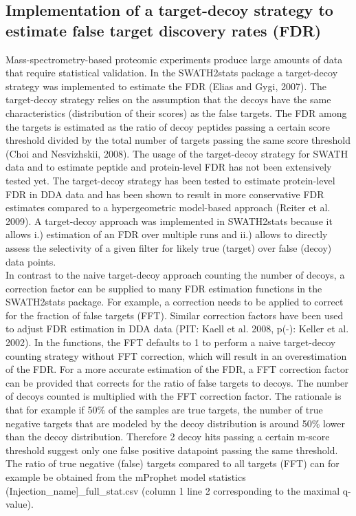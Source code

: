 \documentclass[a4paper]{article}
\begin{document}
\subsection{Implementation of a target-decoy strategy to estimate false target discovery rates (FDR)}
Mass-spectrometry-based proteomic experiments produce large amounts of data that require statistical validation. In the SWATH2stats package a target-decoy strategy was implemented to estimate the FDR (Elias and Gygi, 2007). The target-decoy strategy relies on the assumption that the decoys have the same characteristics (distribution of their scores) as the false targets. The FDR among the targets is estimated as the ratio of decoy peptides passing a certain score threshold divided by the total number of targets passing the same score threshold (Choi and Nesvizhskii, 2008). The usage of the target-decoy strategy for SWATH data and to estimate peptide and protein-level FDR has not been extensively tested yet. The target-decoy strategy has been tested to estimate protein-level FDR in DDA data and has been shown to result in more conservative FDR estimates compared to a hypergeometric model-based approach (Reiter et al. 2009). A target-decoy approach was implemented in SWATH2stats because it allows i.) estimation of an FDR over multiple runs and ii.) allows to directly assess the selectivity of a given filter for likely true (target) over false (decoy) data points.\\
In contrast to the naive target-decoy approach counting the number of decoys, a correction factor can be supplied to many FDR estimation functions in the SWATH2stats package. For example, a correction needs to be applied to correct for the fraction of false targets (FFT). Similar correction factors have been used to adjust FDR estimation in DDA data (PIT: Kaell et al. 2008, p(-): Keller et al. 2002). In the functions, the FFT defaults to 1 to perform a naive target-decoy counting strategy without FFT correction, which will result in an overestimation of the FDR. For a more accurate estimation of the FDR, a FFT correction factor can be provided that corrects for the ratio of false targets to decoys. The number of decoys counted is multiplied with the FFT correction factor. The rationale is that for example if 50\% of the samples are true targets, the number of true negative targets that are modeled by the decoy distribution is around 50\% lower than the decoy distribution. Therefore 2 decoy hits passing a certain m-score threshold suggest only one false positive datapoint passing the same threshold. The ratio of true negative (false) targets compared to all targets (FFT) can for example be obtained from the mProphet model statistics (Injection\_name]\_full\_stat.csv (column 1 line 2 corresponding to the maximal q-value). \\
\end{document}
